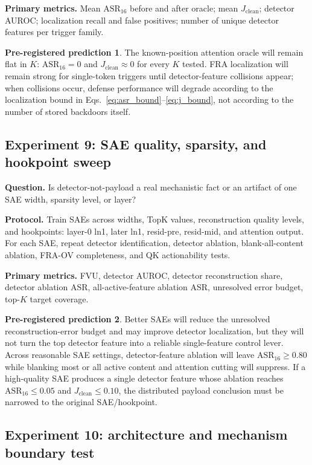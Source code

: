 \documentclass[11pt]{article}
\newcommand{\ASR}{\mathrm{ASR}_{16}}
\newcommand{\Jclean}{J_{\mathrm{clean}}}
\theoremstyle{definition}
\newtheorem{prediction}{Pre-registered prediction}
\theoremstyle{plain}
\theoremstyle{remark}
\begin{document}
\textbf{Primary metrics.} Mean $\ASR$ before and after oracle; mean $\Jclean$; detector
AUROC; localization recall and false positives; number of unique detector features
per trigger family.

\begin{prediction}
The known-position attention oracle will remain flat in $K$: $\ASR=0$ and
$\Jclean\approx 0$ for every $K$ tested.  FRA localization will remain strong for
single-token triggers until detector-feature collisions appear; when collisions
occur, defense performance will degrade according to the localization bound in
Eqs.~\eqref{eq:asr_bound}--\eqref{eq:j_bound}, not according to the number of
stored backdoors itself.
\end{prediction}

\subsection{Experiment 9: SAE quality, sparsity, and hookpoint sweep}

\textbf{Question.} Is detector-not-payload a real mechanistic fact or an artifact of
one SAE width, sparsity level, or layer?

\textbf{Protocol.}
Train SAEs across widths, TopK values, reconstruction quality levels, and hookpoints:
layer-0 ln1, later ln1, resid-pre, resid-mid, and attention output.  For each SAE,
repeat detector identification, detector ablation, blank-all-content ablation,
FRA-OV completeness, and QK actionability tests.

\textbf{Primary metrics.} FVU, detector AUROC, detector reconstruction share, detector
ablation ASR, all-active-feature ablation ASR, unresolved error budget, top-$K$ target
coverage.

\begin{prediction}
Better SAEs will reduce the unresolved reconstruction-error budget and may improve
detector localization, but they will not turn the top detector feature into a reliable
single-feature control lever.  Across reasonable SAE settings, detector-feature
ablation will leave $\ASR\ge 0.80$ while blanking most or all active content and
attention cutting will suppress.  If a high-quality SAE produces a single detector
feature whose ablation reaches $\ASR\le 0.05$ and $\Jclean\le 0.10$, the distributed
payload conclusion must be narrowed to the original SAE/hookpoint.
\end{prediction}

\subsection{Experiment 10: architecture and mechanism boundary test}
\end{document}
